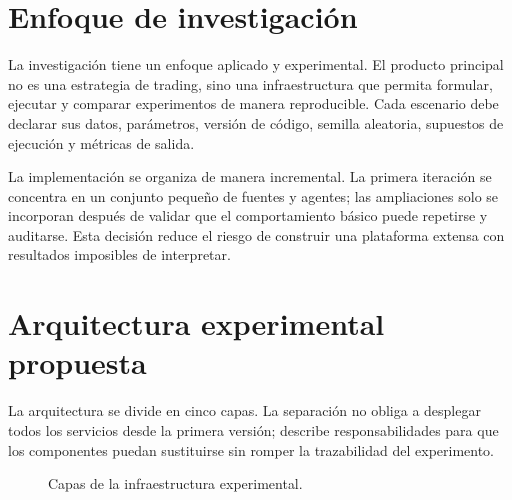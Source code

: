 \section{Enfoque de investigación}

La investigación tiene un enfoque aplicado y experimental. El producto principal no es una estrategia de trading, sino una infraestructura que permita formular, ejecutar y comparar experimentos de manera reproducible. Cada escenario debe declarar sus datos, parámetros, versión de código, semilla aleatoria, supuestos de ejecución y métricas de salida.

La implementación se organiza de manera incremental. La primera iteración se concentra en un conjunto pequeño de fuentes y agentes; las ampliaciones solo se incorporan después de validar que el comportamiento básico puede repetirse y auditarse. Esta decisión reduce el riesgo de construir una plataforma extensa con resultados imposibles de interpretar.

\section{Arquitectura experimental propuesta}

La arquitectura se divide en cinco capas. La separación no obliga a desplegar todos los servicios desde la primera versión; describe responsabilidades para que los componentes puedan sustituirse sin romper la trazabilidad del experimento.

\begin{figure}[H]
\centering
{}
\caption{Capas de la infraestructura experimental.}
\label{fig:arquitectura-experimental}
\end{figure}

